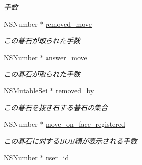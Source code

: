 \begin{DoxyCompactItemize}
\begin{DoxyCompactList}\small\item\em 手数 \end{DoxyCompactList}\item 
\hypertarget{interface_game_records_a1891a621b8d3addee60eaa57cc97669b}{
NSNumber $\ast$ \hyperlink{interface_game_records_a1891a621b8d3addee60eaa57cc97669b}{removed\_\-move}}
\label{interface_game_records_a1891a621b8d3addee60eaa57cc97669b}

\begin{DoxyCompactList}\small\item\em この碁石が取られた手数 \end{DoxyCompactList}\item 
\hypertarget{interface_game_records_aa8c3d63ac5ffc94c6e609611077d05e6}{
NSNumber $\ast$ \hyperlink{interface_game_records_aa8c3d63ac5ffc94c6e609611077d05e6}{answer\_\-move}}
\label{interface_game_records_aa8c3d63ac5ffc94c6e609611077d05e6}

\begin{DoxyCompactList}\small\item\em この碁石が取られた手数 \end{DoxyCompactList}\item 
\hypertarget{interface_game_records_aaa51d10929ed1036b17733a784829225}{
NSMutableSet $\ast$ \hyperlink{interface_game_records_aaa51d10929ed1036b17733a784829225}{removed\_\-by}}
\label{interface_game_records_aaa51d10929ed1036b17733a784829225}

\begin{DoxyCompactList}\small\item\em この碁石を抜き石する碁石の集合 \end{DoxyCompactList}\item 
\hypertarget{interface_game_records_aee248296724ff88c12d0a634f44ba1c7}{
NSNumber $\ast$ \hyperlink{interface_game_records_aee248296724ff88c12d0a634f44ba1c7}{move\_\-on\_\-face\_\-registered}}
\label{interface_game_records_aee248296724ff88c12d0a634f44ba1c7}

\begin{DoxyCompactList}\small\item\em この碁石に対するBOB顔が表示される手数 \end{DoxyCompactList}\item 
\hypertarget{interface_game_records_ac772364449252fb44da4c0e5f3103c18}{
NSNumber $\ast$ \hyperlink{interface_game_records_ac772364449252fb44da4c0e5f3103c18}{user\_\-id}}
\label{interface_game_records_ac772364449252fb44da4c0e5f3103c18}


\end{DoxyCompactItemize}

